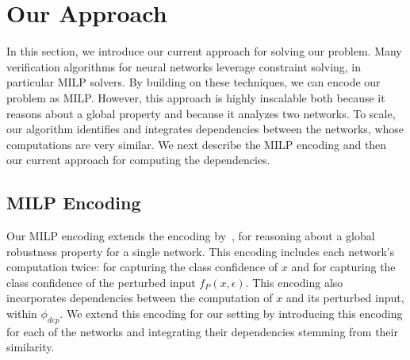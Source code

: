 
\section{Our Approach}
In this section, we introduce our current approach for solving our problem.
Many verification algorithms for neural networks leverage constraint solving, in particular MILP solvers. 
By building on these techniques, we can encode our problem as MILP. However, this approach is highly inscalable both because it reasons about a global property and because it analyzes two networks.
To scale, our algorithm identifies and integrates dependencies between the networks, whose computations are very similar. 
We next describe the MILP encoding and then our current approach for computing the dependencies.

\subsection{MILP Encoding}
Our MILP encoding extends the encoding by~\cite{VHAGAR}, for reasoning about a global robustness property for a single network.
This encoding includes each network's computation twice: for capturing the class confidence of $x$ and for capturing the class confidence of the perturbed input $f_P(x,\epsilon)$. This encoding also incorporates dependencies between the computation of $x$ and its perturbed input, within $\phi_{dep}$. We extend this encoding for our setting by introducing this encoding for each of the networks and integrating their dependencies stemming from their similarity.

